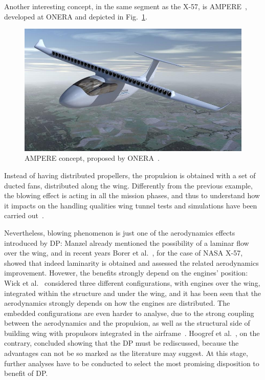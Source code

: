 Another interesting concept, in the same segment as the X-57, is AMPERE~\cite{bib:ampere_ref}, developed at ONERA and depicted in Fig.~\ref{fig:ampere}. 
\begin{figure}[h!]
	\centering
	\includegraphics[keepaspectratio, width=0.5\linewidth]{images/chap1/ampere.jpg}
	\caption{AMPERE concept, proposed by ONERA~\cite{bib:ampere_ref}.}
	\label{fig:ampere}
\end{figure}
Instead of having distributed propellers, the propulsion is obtained with a set of ducted fans, distributed along the wing. 
Differently from the previous example, the blowing effect is acting in all the mission phases, and thus to understand how it impacts on the handling qualities wing tunnel tests and simulations have been carried out~\cite{bib:dillinger_ampere}. 

Nevertheless, blowing phenomenon is just one of the aerodynamics effects introduced by DP: Manzel already mentioned the possibility of a laminar flow over the wing, and in recent years Borer et al.~\cite{bib:borer}, for the case of NASA X-57, showed that indeed laminarity is obtained and assessed the related aerodynamics improvement. 
Hovewer, the benefits strongly depend on the engines' position: Wick et al.~\cite{bib:wick} considered three different configurations, with engines over the wing, integrated within the structure and under the wing, and it has been seen that the aerodynamics strongly depends on how the engines are distributed. 
The embedded configurations are even harder to analyse, due to the strong coupling between the aerodynamics and the propulsion, as well as the structural side of building wing with propulsors integrated in the airframe~\cite{bib:khero}. 
Hoogref et al.~\cite{bib:hoogreef}, on the contrary, concluded showing that the DP must be rediscussed, because the advantages can not be so marked as the literature may suggest.
At this stage, further analyses have to be conducted to select the most promising disposition to benefit of DP. 

